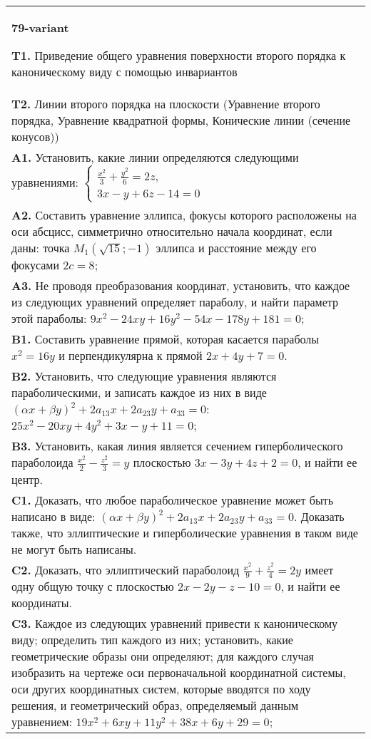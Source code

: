 \documentclass{article}
\begin{document}
\begin{tabular}{m{17cm}}
\textbf{79-variant}
\newline

\textbf{T1.} Приведение общего уравнения поверхности второго порядка к каноническому виду с помощью инвариантов \\
\textbf{T2.} Линии второго порядка на плоскости (Уравнение второго порядка, Уравнение квадратной формы, Конические линии (сечение конусов)) \\
\textbf{A1.} Установить, какие линии определяются следующими уравнениями: $\left\{\begin{array}{l}\frac{x^2}{3}+\frac{y^2}{6}=2 z, \\ 3 x-y+6 z-14=0\end{array}\right.$ \\
\textbf{A2.} Составить уравнение эллипса, фокусы которого расположены на оси абсцисс, симметрично относительно начала координат, если даны: точка $M_1(\sqrt{15} ;-1)$ эллипса и расстояние между его фокусами $2 c=8$; \\
\textbf{A3.} Не проводя преобразования координат, установить, что каждое из следующих уравнений определяет параболу, и найти параметр этой параболы: $9 x^2-24 x y+16 y^2-54 x-178 y+181=0$; \\
\textbf{B1.} Составить уравнение прямой, которая касается параболы $x^2=16 y$ и перпендикулярна к прямой $2 x+4 y+7=0$. \\
\textbf{B2.} Установить, что следующие уравнения являются параболическими, и записать каждое из них в виде $(\alpha x+\beta y)^2+2 a_{13} x+2 a_{23} y+a_{33}=0$: $25 x^2-20 x y+4 y^2+3 x-y+11=0$; \\
\textbf{B3.} Установить, какая линия является сечением гиперболического параболоида $\frac{x^2}{2}-\frac{z^2}{3}=y$ плоскостью $3 x-3 y+4 z+2=0$, и найти ее центр. \\
\textbf{C1.} Доказать, что любое параболическое уравнение может быть написано в виде: $ (\alpha x+\beta y) ^2+2a_{13}x+2a_{23}y+a_{33}=0$. Доказать также, что эллиптические и гиперболические уравнения в таком виде не могут быть написаны. \\
\textbf{C2.} Доказать, что эллиптический параболоид $\frac{x^2}{9}+\frac{z^2}{4}=2 y$ имеет одну общую точку с плоскостью $2 x-2 y-z-10=0$, и найти ее координаты. \\
\textbf{C3.} Каждое из следующих уравнений привести к каноническому виду; определить тип каждого из них; установить, какие геометрические образы они определяют; для каждого случая изобразить на чертеже оси первоначальной координатной системы, оси других координатных систем, которые вводятся по ходу решения, и геометрический образ, определяемый данным уравнением: $19 x^2+6 x y+11 y^2+38 x+6 y+29=0$; \\

\end{tabular}
\vspace{1cm}
\end{document}

